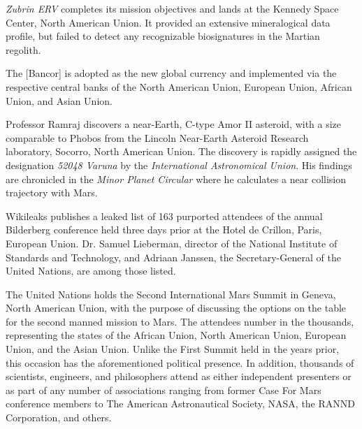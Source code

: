 {\it Zubrin ERV} completes its mission objectives and lands at the Kennedy Space Center, North American Union. It provided an extensive mineralogical data profile, but failed to detect any recognizable biosignatures in the Martian regolith.
\StopTimelineDate

The [Bancor] is adopted as the new global currency and implemented via the respective central banks of the North American Union, European Union, African Union, and Asian Union.
\StopTimelineDate

Professor Ramraj discovers a near-Earth, C-type Amor II asteroid, with a size comparable to Phobos from the Lincoln Near-Earth Asteroid Research laboratory, Socorro, North American Union. The discovery is rapidly assigned the designation {\it 52048 Varuna} by the {\it International Astronomical Union}. His findings are chronicled in the {\it Minor Planet Circular} where he calculates a near collision trajectory with Mars.
\StopTimelineDate

Wikileaks publishes a leaked list of 163 purported attendees of the annual Bilderberg conference held three days prior at the Hotel de Crillon, Paris, European Union. Dr. Samuel Lieberman, director of the National Institute of Standards and Technology, and Adriaan Janssen, the Secretary-General of the United Nations, are among those listed.
\StopTimelineDate

The United Nations holds the Second International Mars Summit in Geneva, North American Union, with the purpose of discussing the options on the table for the second manned mission to Mars. The attendees number in the thousands, representing the states of the African Union, North American Union, European Union, and the Asian Union. Unlike the First Summit held in the years prior, this occasion has the aforementioned political presence. In addition, thousands of scientists, engineers, and philosophers attend as either independent presenters or as part of any number of associations ranging from former Case For Mars conference members to The American Astronautical Society, NASA, the RANND Corporation, and others.

